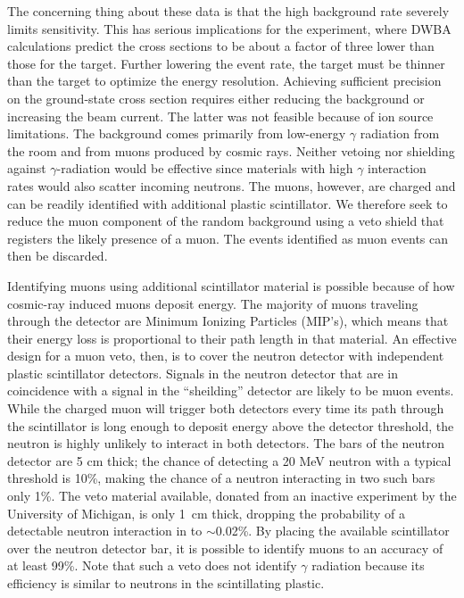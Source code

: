 The concerning thing about these data is that the high background rate severely limits sensitivity.  This has serious implications for the \GeTargets experiment, where DWBA calculations predict the cross sections to be about a factor of three lower than those for the  target.  Further lowering the event rate, the \GeTargets target must be thinner than the  target to optimize the energy resolution.  Achieving sufficient precision on the ground-state cross section requires either reducing the background or increasing the beam current.  The latter was not feasible because of ion source limitations.  The background comes primarily from low-energy $\gamma$ radiation from the room and from muons produced by cosmic rays.  Neither vetoing nor shielding against $\gamma$-radiation would be effective since materials with high $\gamma$ interaction rates would also scatter incoming neutrons.  The muons, however, are charged and can be readily identified with additional plastic scintillator.  We therefore seek to reduce the muon component of the random background using a veto shield that registers the likely presence of a muon.  The events identified as muon events can then be discarded.  

Identifying muons using additional scintillator material is possible because of how cosmic-ray induced muons deposit energy.  The majority of muons traveling through the detector are Minimum Ionizing Particles (MIP's), which means that their energy loss is proportional to their path length in that material.  An effective design for a muon veto, then, is to cover the neutron detector with independent plastic scintillator detectors.  Signals in the neutron detector that are in coincidence with a signal in the ``sheilding'' detector are likely to be muon events.  While the charged muon will trigger both detectors every time its path through the scintillator is long enough to deposit energy above the detector threshold, the neutron is highly unlikely to interact in both detectors.  The bars of the neutron detector are 5 cm thick; the chance of detecting a 20 MeV neutron with a typical threshold is 10\%, making the chance of a neutron interacting in two such bars only 1\%.  The veto material available, donated from an inactive experiment by the University of Michigan, is only 1~cm thick, dropping the probability of a detectable neutron interaction in to $\sim$0.02\%.  By placing the available scintillator over the neutron detector bar, it is possible to identify muons to an accuracy of at least 99\%.  Note that such a veto does not identify $\gamma$ radiation because its efficiency is similar to neutrons in the scintillating plastic. 


